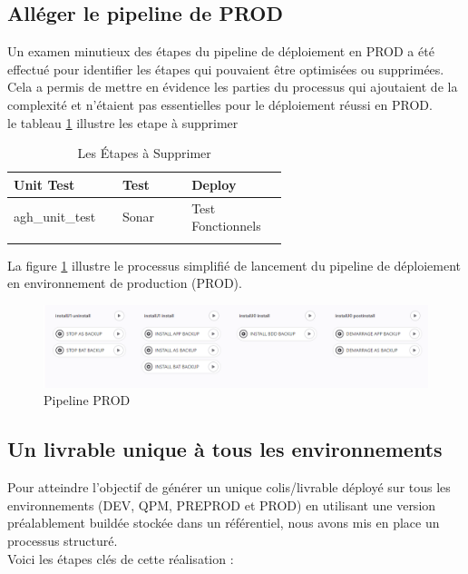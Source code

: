 {\subsection{Alléger le pipeline de PROD}
Un examen minutieux des étapes du pipeline de déploiement en PROD a été effectué pour identifier les étapes qui pouvaient être optimisées ou supprimées. Cela a permis de mettre en évidence les parties du processus qui ajoutaient de la complexité et n'étaient pas essentielles pour le déploiement réussi en PROD.\\
le tableau \ref{tab:les-etapes-a-supprimer} illustre les etape à supprimer
\begin{longtable}{|>{\centering\arraybackslash}m{0.2\linewidth}|>{\centering\arraybackslash}m{0.2\linewidth}|>{\centering\arraybackslash}m{0.2\linewidth}|}
\hline
Unit Test & Test & Deploy \\
\hline
agh\_unit\_test & Sonar & Test Fonctionnels \\
\hline
\caption{Les Étapes à Supprimer}
\label{tab:les-etapes-a-supprimer}
\end{longtable}

La figure \ref{PROD} illustre le processus simplifié de lancement du pipeline de déploiement en environnement de production (PROD).

\begin{figure}[H]
    \centering\includegraphics[scale=0.55]{img/PROD.PNG}
    \caption{Pipeline PROD }
    \label{PROD}
 \end{figure}
 \subsection{Un livrable unique à tous les environnements}
 Pour atteindre l'objectif de générer un unique colis/livrable déployé sur tous les environnements (DEV, QPM, PREPROD et PROD) en utilisant une version préalablement buildée stockée dans un référentiel, nous avons mis en place un processus structuré. \\
 Voici les étapes clés de cette réalisation :
 \newpage
}
